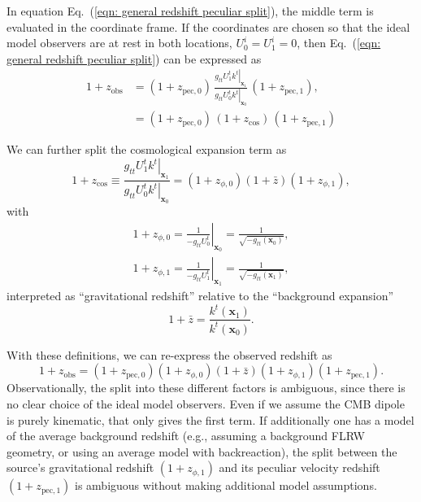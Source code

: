 \documentclass[a4paper,12pt]{report}
\renewcommand{\vec}[1]{\ensuremath{\bm{#1}}}
\renewcommand{\eqref}[1]{Eq.~({#1})}
\begin{document}
In equation \eqref{\ref{eqn: general redshift peculiar split}}, the middle term is evaluated in the coordinate frame. If the coordinates are chosen so that the ideal model observers are at rest in both locations, $U_0^i = U_1^i = 0$, then \eqref{\ref{eqn: general redshift peculiar split}} can be expressed as
\begin{align}
    1+z_\text{obs} &= (1+z_{\text{pec},0})\,
    \frac{\left. g_{tt} U^t_1 k^t\right| _{\vec{x}_1}}{\left. g_{tt} U^t_0 k^t\right|_{\vec{x}_0}}\,
    (1+z_{\text{pec},1}), \\
    &= (1+z_{\text{pec},0})\,
    (1+z_\text{cos})\,
    (1+z_{\text{pec},1})
\end{align}

We can further split the cosmological expansion term as
\begin{equation}
    1+z_\text{cos} \equiv
    \frac{\left. g_{tt} U^t_1 k^t\right| _{\vec{x}_1}}{\left. g_{tt} U^t_0 k^t\right|_{\vec{x}_0}} =
    (1+z_{\phi,0})(1+\bar{z})(1+z_{\phi,1}),
\end{equation}
with
\begin{align}
    1+z_{\phi,0}
    = \left. \frac{1}{-g_{tt}U_0^t}\right|_{\vec{x}_0}
    = \frac{1}{\sqrt{-g_{tt}(\vec{x}_0)}}, \\
    1+z_{\phi,1}
    = \left. \frac{1}{-g_{tt}U_1^t}\right|_{\vec{x}_1}
    = \frac{1}{\sqrt{-g_{tt}(\vec{x}_1)}},
\end{align}
interpreted as ``gravitational redshift'' relative to the ``background expansion''
\begin{equation}
    1+\bar{z} = \frac{k^t(\vec{x}_1)}{k^t(\vec{x}_0)}.
\end{equation}

With these definitions, we can re-express the observed redshift as
\begin{equation} \label{eqn: generic redshift factors}
    1+z_\text{obs} = (1+z_{\text{pec},0})
    (1+z_{\phi,0})(1+\bar{z})(1+z_{\phi,1})
    (1+z_{\text{pec},1}).
\end{equation}
Observationally, the split into these different factors is ambiguous, since there is no clear choice of the ideal model observers. Even if we assume the CMB dipole is purely kinematic, that only gives the first term. If additionally one has a model of the average background redshift (e.g., assuming a background FLRW geometry, or using an average model with backreaction), the split between the source's gravitational redshift $(1+z_{\phi,1})$ and its peculiar velocity redshift $(1+z_{\text{pec},1})$ is ambiguous without making additional model assumptions.
\end{document}
